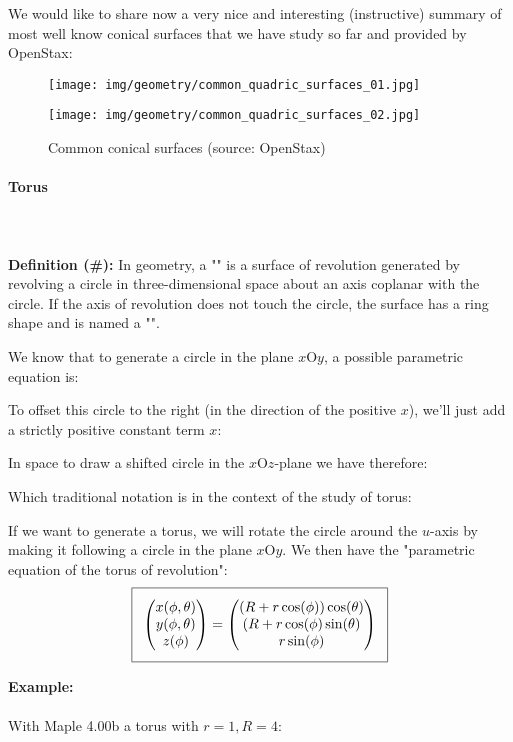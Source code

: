 {	We would like to share now a very nice and interesting (instructive) summary of most well know conical surfaces that we have study so far and provided by OpenStax:
	\begin{figure}[H]
		\centering
		\texttt{[image: img/geometry/common\_quadric\_surfaces\_01.jpg]}
	\end{figure}
	\begin{figure}[H]
		\centering
		\texttt{[image: img/geometry/common\_quadric\_surfaces\_02.jpg]}
		\caption{Common conical surfaces (source: OpenStax)}
	\end{figure}
	\pagebreak
	\paragraph{Torus}\mbox{}\\\\
	\textbf{Definition (\#\mydef):} In geometry, a "" is a surface of revolution generated by revolving a circle in three-dimensional space about an axis coplanar with the circle. If the axis of revolution does not touch the circle, the surface has a ring shape and is named a "".
	
	We know that to generate a circle in the plane $x\text{O}y$, a possible parametric equation is:
	
	To offset this circle to the right (in the direction of the positive $x$), we'll just add a strictly positive constant term $x$:
	
	In space to draw a shifted circle in the $x\text{O}z$-plane we have therefore:
	
	Which traditional notation is in the context of the study of torus:
	
	If we want to generate a torus, we will rotate the circle around the $u$-axis by making it following a circle in the plane $x\text{O}y$. We then have the  "parametric equation of the torus of revolution":
	\begin{equation}
	  \addtolength{\fboxsep}{5pt}
	   \boxed{
	   \begin{gathered}
	   		\begin{pmatrix}
	   		x(\phi,\theta)\\y(\phi,\theta)\\z(\phi)
	   		\end{pmatrix}=
	   		\begin{pmatrix}
	   		(R+r\cos(\phi))\cos(\theta)\\(R+r\cos(\phi)\sin(\theta)\\r\sin(\phi)
	   		\end{pmatrix}
	   \end{gathered}
	   }
	\end{equation}
	\begin{tcolorbox}[colframe=black,colback=white,sharp corners]
	\textbf{{\Large {}}Example:}\\\\
	With Maple 4.00b a torus with $r=1,R=4$:\\


\end{tcolorbox}}
